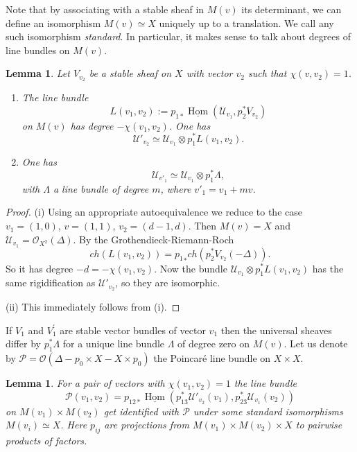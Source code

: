 \documentclass[reqno]{amsart}
\newtheorem{lemma}[theorem]{Lemma}
\theoremstyle{definition}
\theoremstyle{remark}
\newcommand{\ot}{\otimes}
\newcommand{\Hom}{\operatorname{Hom}}
\newcommand{\OO}{{\mathcal O}}
\newcommand{\PP}{{\mathcal P}}
\newcommand{\UU}{{\mathcal U}}
\newcommand{\De}{\Delta}
\newcommand{\cU}{\mathcal{U}}
\numberwithin{equation}{section}
\begin{document}
Note that by associating with a stable sheaf in $M(v)$ its determinant, we can define an isomorphism $M(v)\simeq X$ uniquely up to a translation. 
We call any such isomorphism {\it standard}.
In particular, it makes sense to talk about degrees of line bundles on $M(v)$.

\begin{lemma}\label{univ-bundle-lem1}
Let $V_{v_2}$ be a stable sheaf on $X$ with vector $v_2$ such that $\chi(v,v_2)=1$.
\begin{enumerate}
\item[$(i)$] The line bundle 
$$L(v_1,v_2):=p_{1*}\underline{\Hom}(\cU_{v_1},p_2^*V_{v_2})$$ 
on $M(v)$ has degree $-\chi(v_1,v_2)$. One has
$$\UU'_{v_2}\simeq \cU_{v_1}\ot p_1^*L(v_1,v_2).$$

\item[$(ii)$] One has 
$$\cU_{v'_1}\simeq \cU_{v_1}\ot p_1^*\Lambda,$$
with $\Lambda$ a line bundle of degree $m$, where $v'_1=v_1+mv$.
\end{enumerate}
\end{lemma}

\begin{proof}
(i) Using an appropriate autoequivalence we reduce to the case $v_1=(1,0)$, $v=(1,1)$, $v_2=(d-1,d)$. Then $M(v)=X$ and $\cU_{v_1}=\OO_{X^2}(\De)$.
By the Grothendieck-Riemann-Roch
\[
ch(L(v_1,v_2))={p_1}_*ch(p_2^*V_{v_2}(-\Delta)).
\]
So it has degree $-d=-\chi(v_1,v_2)$.
Now the bundle $\cU_{v_1}\ot p_1^*L(v_1,v_2)$ has the same rigidification as $\cU'_{v_2}$, so they are isomorphic.

\noindent
(ii) This immediately follows from (i).
\end{proof}
If $V_1$ and $V_1^\prime$ are stable vector bundles of vector $v_1$ then the universal sheaves differ by $p_1^*\Lambda$ for a unique line bundle $\Lambda$ of degree zero on $M(v)$.
Let us denote by $\PP=\OO(\De-p_0\times X-X\times p_0)$ the Poincar\'e line bundle on $X\times X$.

\begin{lemma}\label{poincare-moduli-lem}
For a pair of vectors with $\chi(v_1,v_2)=1$ the line bundle
$$\PP(v_1,v_2)=p_{12*}\underline{\Hom}(p_{13}^*\cU'_{v_2}(v_1),p_{23}^*\UU_{v_1}(v_2))$$
on $M(v_1)\times M(v_2)$ get identified with $\PP$ under some standard isomorphisms $M(v_i)\simeq X$.
Here $p_{ij}$ are projections from $M(v_1)\times M(v_2)\times X$ to pairwise products of factors.
\end{lemma}
\end{document}
